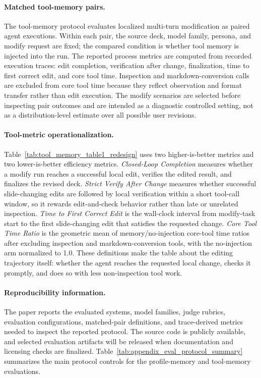 \paragraph{Matched tool-memory pairs.}
The tool-memory protocol evaluates localized multi-turn modification as paired
agent executions. Within each pair, the source deck, model family, persona, and
modify request are fixed; the compared condition is whether tool memory is
injected into the run. The reported process metrics are computed from recorded
execution traces: edit completion, verification after change, finalization,
time to first correct edit, and core tool time. Inspection and
markdown-conversion calls are excluded from core tool time because they reflect
observation and format transfer rather than edit execution. The modify
scenarios are selected before inspecting pair outcomes and are intended as a
diagnostic controlled setting, not as a distribution-level estimate over all
possible user revisions. 
\paragraph{Tool-metric operationalization.}
Table~\ref{tab:tool_memory_table1_redesign} uses two higher-is-better metrics
and two lower-is-better efficiency metrics. \textit{Closed-Loop Completion}
measures whether a modify run reaches a successful local edit, verifies the
edited result, and finalizes the revised deck. \textit{Strict Verify After
Change} measures whether successful slide-changing edits are followed by local
verification within a short tool-call window, so it rewards edit-and-check
behavior rather than late or unrelated inspection. \textit{Time to First Correct
Edit} is the wall-clock interval from modify-task start to the first
slide-changing edit that satisfies the requested change. \textit{Core Tool Time
Ratio} is the geometric mean of memory/no-injection core-tool time ratios after
excluding inspection and markdown-conversion tools, with the no-injection arm
normalized to 1.0. These definitions make the table about the editing
trajectory itself: whether the agent reaches the requested local change, checks
it promptly, and does so with less non-inspection tool work.

\paragraph{Reproducibility information.}
The paper reports the evaluated systems, model families, judge rubrics,
evaluation configurations, matched-pair definitions, and trace-derived metrics
needed to inspect the reported protocol. The source code is publicly available,
and selected evaluation artifacts will be released when documentation and
licensing checks are finalized.
Table~\ref{tab:appendix_eval_protocol_summary} summarizes the main protocol
controls for the profile-memory and tool-memory evaluations.

